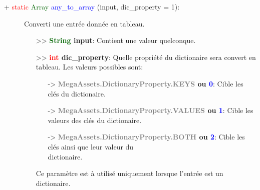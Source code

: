 \documentclass[a4paper, 11pt]{article}
\begin{document}
	\begin{description}
		\item [+ \textcolor{red}{static} \textcolor{darkgreen}{Array} \textcolor{blue}{any\_to\_array} 
		(input, dic\_property = 1):] Converti une entrée donnée en tableau.
		\begin{itemize}
			\item [>> \textbf{\textcolor{darkgreen}{String} input}:] Contient une valeur quelconque.
			\item [>> \textbf{\textcolor{red}{int} dic\_property}:] Quelle propriété du dictionaire sera 
			convert en tableau. Les valeurs possibles sont:
			\begin{itemize}
				\item [-> \textbf{\textcolor{gray}{MegaAssets.DictionaryProperty.KEYS} ou \textcolor{blue}
				{0}}:] Cible les clés du dictionaire.
				\item [-> \textbf{\textcolor{gray}{MegaAssets.DictionaryProperty.VALUES} ou \textcolor{blue}
				{1}}:] Cible les valeurs des clés du dictionaire.
				\item [-> \textbf{\textcolor{gray}{MegaAssets.DictionaryProperty.BOTH} ou \textcolor{blue}
				{2}}:] Cible les clés ainsi que leur valeur du \\dictionaire.
			\end{itemize}
			Ce paramètre est à utilisé uniquement lorsque l'entrée est un dictionaire.\\
		\end{itemize}
	\end{description}
\end{document}
